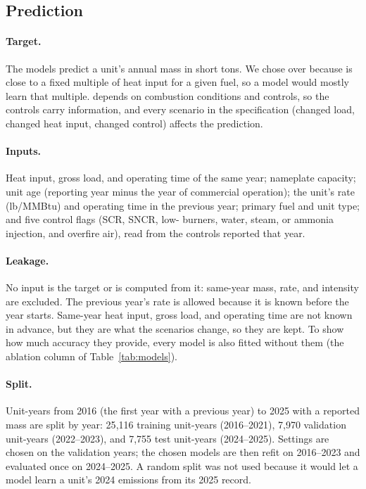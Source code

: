 \documentclass[11pt,a4paper]{article}
\begin{document}
\subsection{Prediction}
\label{sec:prediction}

\paragraph{Target.} The models predict a unit's annual \NOx{} mass in short tons. We chose \NOx{}
over \COtwo{} because \COtwo{} is close to a fixed multiple of heat input for a given fuel, so a
\COtwo{} model would mostly learn that multiple. \NOx{} depends on combustion conditions and
controls, so the controls carry information, and every scenario in the specification (changed
load, changed heat input, changed control) affects the prediction.

\paragraph{Inputs.} Heat input, gross load, and operating time of the same year; nameplate
capacity; unit age (reporting year minus the year of commercial operation); the unit's \NOx{}
rate (lb/MMBtu) and operating time in the previous year; primary fuel and unit type; and five
\NOx{} control flags (SCR, SNCR, low-\NOx{} burners, water, steam, or ammonia injection, and
overfire air), read from the controls reported that year.

\paragraph{Leakage.} No input is the target or is computed from it: same-year \NOx{} mass,
\NOx{} rate, and \NOx{} intensity are excluded. The previous year's \NOx{} rate is allowed because
it is known before the year starts. Same-year heat input, gross load, and operating time are not
known in advance, but they are what the scenarios change, so they are kept. To show how much
accuracy they provide, every model is also fitted without them (the ablation column of
Table~\ref{tab:models}).

\paragraph{Split.} Unit-years from 2016 (the first year with a previous year) to 2025 with a
reported \NOx{} mass are split by year: 25{,}116 training unit-years (2016--2021), 7{,}970
validation unit-years (2022--2023), and 7{,}755 test unit-years (2024--2025). Settings are chosen
on the validation years; the chosen models are then refit on 2016--2023 and evaluated once on
2024--2025. A random split was not used because it would let a model learn a unit's 2024
emissions from its 2025 record.
\end{document}
